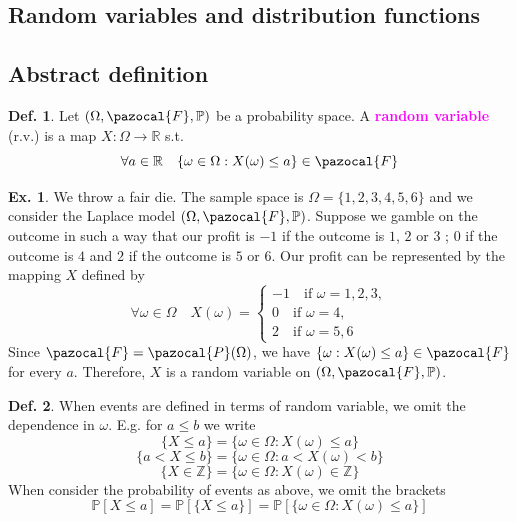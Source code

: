 \documentclass[8pt,a4paper,landscape]{article}
\theoremstyle{definition}
\newtheorem{definition}{Def.}[section]
\theoremstyle{example}
\newtheorem{example}{Ex.}[section]
\theoremstyle{intuition}
\theoremstyle{definition}
\newcommand{\Fb}{\pazocal{F}}
\newcommand{\Pb}{\pazocal{P}}
\newcommand{\mydef}[1]{\textcolor{magenta}{\textbf{#1}}}
\newcommand{\prob}[1]{\mathbb{P}\left[ #1 \right]}
\begin{document}
\begin{multicols}{3}
	\newpage
	\section{Random variables and distribution functions}
			\subsection{Abstract definition}
			
				\begin{definition}
					Let $(\Omega, \Fb, \mathbb{P})$ be a probability space. A \mydef{random variable} (r.v.) is a map $X : \Omega \to \mathbb{R}$ s.t.
					$$						
						\forall a \in \mathbb{R} \quad \{\omega \in \Omega : X(\omega) \leq a\} \in \Fb
					$$
				\end{definition}
				
				\begin{example}
					We throw a fair die. The sample space is $\Omega = \{1,2,3,4,5,6\}$ and we consider the Laplace model $(\Omega, \Fb, \mathbb{P})$. Suppose we gamble on the outcome in such a way that our profit is $-1$ if the outcome is $1$, $2$ or $3$ ; $0$ if the outcome is $4$ and $2$ if the outcome is $5$ or $6$. Our profit can be represented by the mapping $X$ defined by 
					$$
						\forall \omega \in \Omega \quad X(\omega) = \begin{cases}
							-1 \quad \text{if } \omega = 1,2,3, \\
							0 \quad \text{if } \omega = 4, \\
							2 \quad \text{if } \omega = 5,6
						\end{cases}
					$$
					Since $\Fb = \Pb(\Omega)$, we have $\{\omega : X(\omega) \leq a\} \in \Fb$ for every $a$. Therefore, $X$ is a random variable on $(\Omega, \Fb, \mathbb{P})$.
				\end{example}
				
				\begin{definition}
					When events are defined in terms of random variable, we omit the dependence in $\omega$. E.g. for $a \leq b$ we write 
					$$\{X \leq a\} = \{\omega \in \Omega : X(\omega) \leq a\}$$
					$$\{a < X \leq b\} = \{\omega \in \Omega : a < X(\omega) < b\}$$
					$$\{X \in \mathbb{Z}\} = \{\omega \in \Omega : X(\omega) \in \mathbb{Z}\}$$
					When consider the probability of events as above, we omit the brackets 
					$$ \prob{X \leq a} = \prob{\{X \leq a\}} = \prob{\{\omega \in \Omega : X(\omega) \leq a\}}$$
				\end{definition}
				

\end{multicols}
\end{document}
